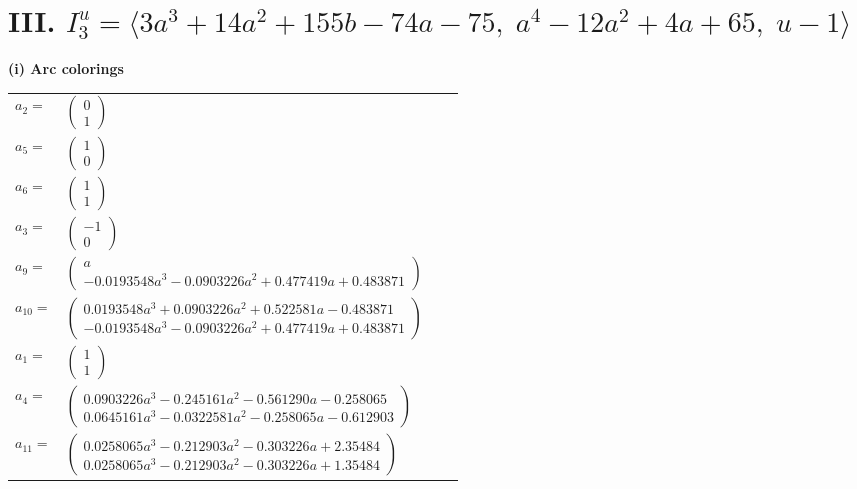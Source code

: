 \documentclass[1p]{elsarticle_modified}
\theoremstyle{definition}
\begin{document}
\centering \section*{III. $I^u_{3}= \langle 3 a^3+14 a^2+155 b-74 a-75,\;a^4-12 a^2+4 a+65,\;u-1 \rangle$}
\flushleft \textbf{(i) Arc colorings}\\
\begin{tabular}{m{7pt} m{180pt} m{7pt} m{180pt} }
\flushright $a_{2}=$&$\begin{pmatrix}0\\1\end{pmatrix}$ \\
\flushright $a_{5}=$&$\begin{pmatrix}1\\0\end{pmatrix}$ \\
\flushright $a_{6}=$&$\begin{pmatrix}1\\1\end{pmatrix}$ \\
\flushright $a_{3}=$&$\begin{pmatrix}-1\\0\end{pmatrix}$ \\
\flushright $a_{9}=$&$\begin{pmatrix}a\\-0.0193548 a^{3}-0.0903226 a^{2}+0.477419 a+0.483871\end{pmatrix}$ \\
\flushright $a_{10}=$&$\begin{pmatrix}0.0193548 a^{3}+0.0903226 a^{2}+0.522581 a-0.483871\\-0.0193548 a^{3}-0.0903226 a^{2}+0.477419 a+0.483871\end{pmatrix}$ \\
\flushright $a_{1}=$&$\begin{pmatrix}1\\1\end{pmatrix}$ \\
\flushright $a_{4}=$&$\begin{pmatrix}0.0903226 a^{3}-0.245161 a^{2}-0.561290 a-0.258065\\0.0645161 a^{3}-0.0322581 a^{2}-0.258065 a-0.612903\end{pmatrix}$ \\
\flushright $a_{11}=$&$\begin{pmatrix}0.0258065 a^{3}-0.212903 a^{2}-0.303226 a+2.35484\\0.0258065 a^{3}-0.212903 a^{2}-0.303226 a+1.35484\end{pmatrix}$ \\

\end{tabular}
\end{document}
